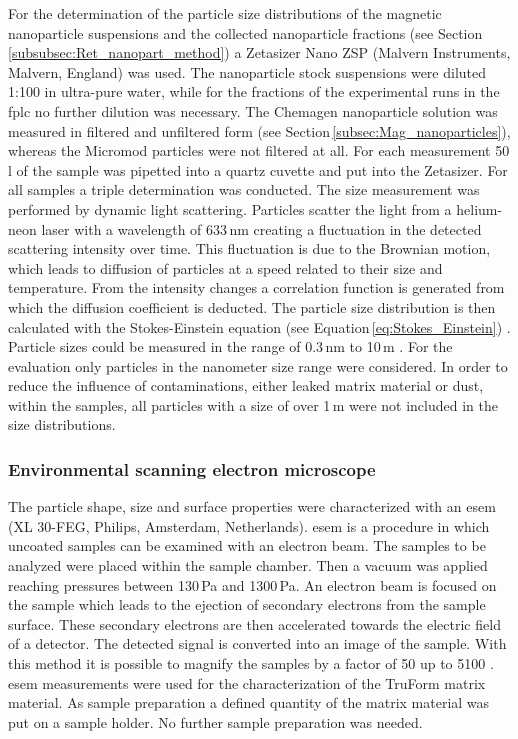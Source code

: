 For the determination of the particle size distributions of the magnetic nanoparticle suspensions and the collected nanoparticle fractions (see Section\,\ref{subsubsec:Ret_nanopart_method}) a Zetasizer Nano ZSP (Malvern Instruments, Malvern, England) was used. The nanoparticle stock suspensions were diluted 1:100 in ultra-pure water, while for the fractions of the experimental runs in the \gls{fplc} no further dilution was necessary. The Chemagen nanoparticle solution was measured in filtered and unfiltered form (see Section\,\ref{subsec:Mag_nanoparticles}), whereas the Micromod particles were not filtered at all. For each measurement 50\,\textmu l of the sample was pipetted into a quartz cuvette and put into the Zetasizer. For all samples a triple determination was conducted. The size measurement was performed by dynamic light scattering. Particles scatter the light from a helium-neon laser with a wavelength of 633\,nm creating a fluctuation in the detected scattering intensity over time. This fluctuation is due to the Brownian motion, which leads to diffusion of particles at a speed related to their size and temperature. From the intensity changes a correlation function is generated from which the diffusion coefficient is deducted. The particle size distribution is then calculated with the Stokes-Einstein equation (see Equation\,\ref{eq:Stokes_Einstein}) \cite{berne2000dynamic}. Particle sizes could be measured in the range of 0.3\,nm to 10\,\textmu m \cite{Zetasizer}. For the evaluation only particles in the nanometer size range were considered. In order to reduce the influence of contaminations, either leaked matrix material or dust, within the samples, all particles with a size of over 1\,\textmu m were not included in the size distributions.

\subsubsection{Environmental scanning electron microscope}
\label{subsubsec:ESEM}
The particle shape, size and surface properties were characterized with an \gls{esem} (XL 30-FEG, Philips, Amsterdam, Netherlands). \gls{esem} is a procedure in which uncoated samples can be examined with an electron beam. The samples to be analyzed were placed within the sample chamber. Then a vacuum was applied reaching pressures between 130\,Pa and 1300\,Pa. An electron beam is focused on the sample which leads to the ejection of secondary electrons from the sample surface. These secondary electrons are then accelerated towards the electric field of a detector. The detected signal is converted into an image of the sample. With this method it is possible to magnify the samples by a factor of 50 up to 5100 \cite{danilatos1993introduction}.     
\gls{esem} measurements were used for the characterization of the TruForm matrix material. As sample preparation a defined quantity of the matrix material was put on a sample holder. No further sample preparation was needed.

